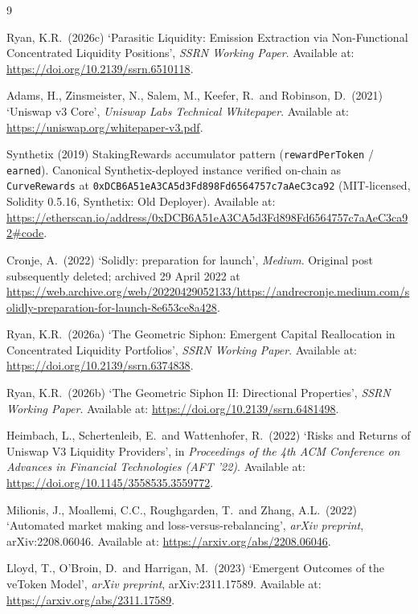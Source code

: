 \documentclass[11pt,a4paper]{article}
\theoremstyle{cgdefinition}
\theoremstyle{cgplain}
\theoremstyle{cgremark}
\begin{document}
\begin{thebibliography}{9}

Ryan, K.R.\ (2026c) `Parasitic Liquidity: Emission Extraction via Non-Functional Concentrated Liquidity Positions', \textit{SSRN Working Paper}. Available at: \url{https://doi.org/10.2139/ssrn.6510118}.

Adams, H., Zinsmeister, N., Salem, M., Keefer, R.\ and Robinson, D.\ (2021) `Uniswap v3 Core', \textit{Uniswap Labs Technical Whitepaper}. Available at: \url{https://uniswap.org/whitepaper-v3.pdf}.

Synthetix (2019) StakingRewards accumulator pattern (\texttt{rewardPerToken} / \texttt{earned}). Canonical Synthetix-deployed instance verified on-chain as \texttt{CurveRewards} at \texttt{0xDCB6A51eA3CA5d3Fd898Fd6564757c7aAeC3ca92} (MIT-licensed, Solidity 0.5.16, Synthetix: Old Deployer). Available at: \url{https://etherscan.io/address/0xDCB6A51eA3CA5d3Fd898Fd6564757c7aAeC3ca92\#code}.

Cronje, A.\ (2022) `Solidly: preparation for launch', \textit{Medium}. Original post subsequently deleted; archived 29 April 2022 at \url{https://web.archive.org/web/20220429052133/https://andrecronje.medium.com/solidly-preparation-for-launch-8e653ce8a428}.

Ryan, K.R.\ (2026a) `The Geometric Siphon: Emergent Capital Reallocation in Concentrated Liquidity Portfolios', \textit{SSRN Working Paper}. Available at: \url{https://doi.org/10.2139/ssrn.6374838}.

Ryan, K.R.\ (2026b) `The Geometric Siphon II: Directional Properties', \textit{SSRN Working Paper}. Available at: \url{https://doi.org/10.2139/ssrn.6481498}.

Heimbach, L., Schertenleib, E.\ and Wattenhofer, R.\ (2022) `Risks and Returns of Uniswap V3 Liquidity Providers', in \textit{Proceedings of the 4th ACM Conference on Advances in Financial Technologies (AFT '22)}. Available at: \url{https://doi.org/10.1145/3558535.3559772}.

Milionis, J., Moallemi, C.C., Roughgarden, T.\ and Zhang, A.L.\ (2022) `Automated market making and loss-versus-rebalancing', \textit{arXiv preprint}, arXiv:2208.06046. Available at: \url{https://arxiv.org/abs/2208.06046}.

Lloyd, T., O'Broin, D.\ and Harrigan, M.\ (2023) `Emergent Outcomes of the veToken Model', \textit{arXiv preprint}, arXiv:2311.17589. Available at: \url{https://arxiv.org/abs/2311.17589}.


\end{thebibliography}
\end{document}
